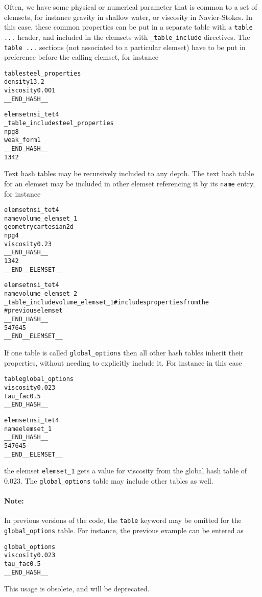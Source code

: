 Often, we have some physical or numerical parameter that is common to
a set of elemsets, for instance gravity in shallow water, or viscosity
in Navier-Stokes.  In this case, these common properties can be put in
a separate table with a \verb+table ...+ header, and included in the
elemsets with \verb+_table_include+ directives.  The \verb+table ...+
sections (not associated to a particular elemset) have to be put in
preference before the calling elemset, for instance
%
\begin{alltt}
table steel_properties   
density 13.2
viscosity 0.001
__END_HASH__

elemset nsi_tet 4
_table_include steel_properties
npg 8
weak_form 1
__END_HASH__
 1 3 4 2
\end{alltt}
%
Text hash tables may be recursively included to any depth. The text
hash table for an elemset may be included in other elemset 
referencing it by its \verb+name+ entry, for instance
%
\begin{alltt}
elemset nsi_tet 4
name volume_elemset_1
geometry cartesian2d
npg 4
viscosity 0.23
__END_HASH__
1 3 4 2
__END__ELEMSET__


elemset nsi_tet 4
name volume_elemset_2
_table_include volume_elemset_1 # includes properties from the
                                # previous elemset
__END_HASH__
 5 4 76 45
__END__ELEMSET__

\end{alltt}


If one table is called \verb+global_options+ then all other hash
tables inherit their properties, without needing to explicitly include
it. For instance in this case
%
\begin{alltt}
table global_options
viscosity 0.023
tau_fac 0.5
__END_HASH__

elemset nsi_tet 4
name elemset_1
__END_HASH__
 5 4 76 45
__END__ELEMSET__
\end{alltt}
%
the elemset \verb+elemset_1+ gets a value for viscosity from the
global hash table of 0.023. The \verb+global_options+ table may
include other tables as well. 

\paragraph{Note:}
In previous versions of the code, the \verb+table+ keyword may be
omitted for the \verb+global_options+ table. For instance, the
previous example can be entered as
%
\begin{alltt}
global_options
viscosity 0.023
tau_fac 0.5
__END_HASH__
\end{alltt}
%
This usage is obsolete, and will be deprecated. 


